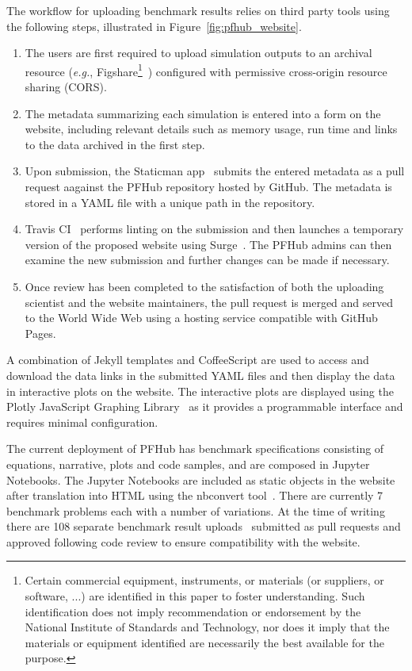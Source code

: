 \documentclass{jors}
\begin{document}
The workflow for uploading benchmark results relies on third party
tools using the following steps, illustrated in
Figure~\ref{fig:pfhub_website}.
\begin{enumerate}
  \item The users are first required to upload simulation outputs to
    an archival resource (\emph{e.g.}, Figshare\footnote{Certain
      commercial equipment, instruments, or materials (or suppliers,
      or software, ...) are identified in this paper to foster
      understanding. Such identification does not imply recommendation
      or endorsement by the National Institute of Standards and
      Technology, nor does it imply that the materials or equipment
      identified are necessarily the best available for the
      purpose.\label{disclaimer}}~\cite{figshare}) configured with
    permissive cross-origin resource sharing (CORS).
  \item The metadata summarizing each simulation is entered into a
    form on the website, including relevant details such as memory
    usage, run time and links to the data archived in the first step.
  \item Upon submission, the Staticman app~\cite{staticman} submits
    the entered metadata as a pull request aagainst the PFHub
    repository hosted by GitHub. The metadata is stored in a YAML file
    with a unique path in the repository.
  \item Travis CI~\cite{travis} performs linting on the submission and
    then launches a temporary version of the proposed website using
    Surge~\cite{surge}. The PFHub admins can then examine the new
    submission and further changes can be made if necessary.
  \item Once review has been completed to the satisfaction of both the
    uploading scientist and the website maintainers, the pull request
    is merged and served to the World Wide Web using a hosting service
    compatible with GitHub Pages.
\end{enumerate}
A combination of Jekyll templates and CoffeeScript are used to access
and download the data links in the submitted YAML files and then
display the data in interactive plots on the website. The interactive
plots are displayed using the Plotly JavaScript Graphing
Library~\cite{plotly} as it provides a programmable interface and
requires minimal configuration.

The current deployment of PFHub has benchmark specifications
consisting of equations, narrative, plots and code samples, and are
composed in Jupyter Notebooks. The Jupyter Notebooks are included as
static objects in the website after translation into HTML using the
nbconvert tool~\cite{jupyter}. There are currently 7 benchmark
problems each with a number of variations. At the time of writing
there are 108 separate benchmark result uploads~\cite{pfhub} submitted
as pull requests and approved following code review to ensure
compatibility with the website.
\end{document}
